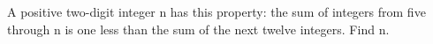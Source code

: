 A positive two-digit integer n has this property: the sum of integers from five through n is one less than the sum of the next twelve integers. Find n.
